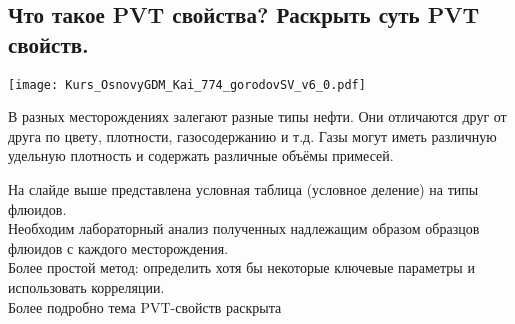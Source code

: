 

\subsection{Что такое PVT свойства? Раскрыть суть PVT свойств.}

\texttt{[image: Kurs\_OsnovyGDM\_Kai\_774\_gorodovSV\_v6\_0.pdf]}

В разных месторождениях залегают разные типы нефти.
Они отличаются друг от друга по цвету, плотности, газосодержанию и т.д.
Газы могут иметь различную удельную плотность и содержать различные объёмы примесей.

На слайде выше представлена условная таблица (условное деление) на типы флюидов.
\\

Необходим лабораторный анализ полученных надлежащим образом образцов флюидов с каждого месторождения.
\\

Более простой метод: определить хотя бы некоторые ключевые параметры и использовать корреляции.
\\

Более подробно тема PVT-свойств раскрыта 


